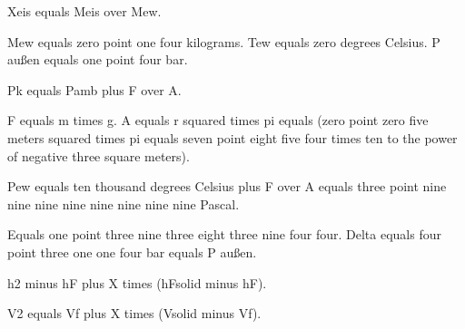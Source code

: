 Xeis equals Meis over Mew.

Mew equals zero point one four kilograms. Tew equals zero degrees Celsius. P außen equals one point four bar.

Pk equals Pamb plus F over A.

F equals m times g. A equals r squared times pi equals (zero point zero five meters squared times pi equals seven point eight five four times ten to the power of negative three square meters).

Pew equals ten thousand degrees Celsius plus F over A equals three point nine nine nine nine nine nine nine nine Pascal.

Equals one point three nine three eight three nine four four. Delta equals four point three one one four bar equals P außen.

h2 minus hF plus X times (hFsolid minus hF).

V2 equals Vf plus X times (Vsolid minus Vf).